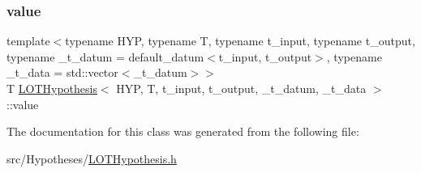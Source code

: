\mbox{\label{class_l_o_t_hypothesis_aff7455a900ffb91790e5235119676a80}} 
\subsubsection{\texorpdfstring{value}{value}}
{\footnotesize\ttfamily template$<$typename H\+YP, typename T, typename t\+\_\+input, typename t\+\_\+output, typename \+\_\+t\+\_\+datum = default\+\_\+datum$<$t\+\_\+input, t\+\_\+output$>$, typename \+\_\+t\+\_\+data = std\+::vector$<$\+\_\+t\+\_\+datum$>$$>$ \\
T \hyperlink{class_l_o_t_hypothesis}{L\+O\+T\+Hypothesis}$<$ H\+YP, T, t\+\_\+input, t\+\_\+output, \+\_\+t\+\_\+datum, \+\_\+t\+\_\+data $>$\+::value}



The documentation for this class was generated from the following file\+:\begin{DoxyCompactItemize}
\item 
src/\+Hypotheses/\hyperlink{_l_o_t_hypothesis_8h}{L\+O\+T\+Hypothesis.\+h}\end{DoxyCompactItemize}
